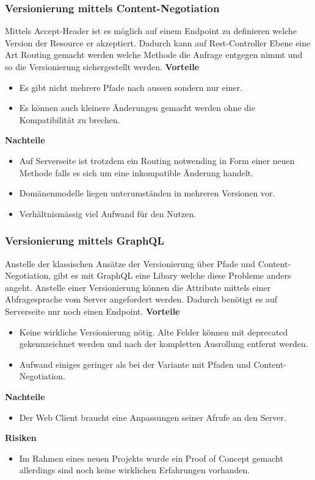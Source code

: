 \subsubsection{Versionierung mittels Content-Negotiation}

Mittels Accept-Header ist es möglich auf einem Endpoint zu definieren welche Version der Resource er akzeptiert. Dadurch kann auf Rest-Controller Ebene eine Art Routing gemacht werden welche Methode die Anfrage entgegen nimmt und so die Versionierung sichergestellt werden.
\newline
\newline
\textbf{Vorteile}
\begin{itemize}
	\item Es gibt nicht mehrere Pfade nach aussen sondern nur einer.
	\item Es können auch kleinere Änderungen gemacht werden ohne die Kompatibilität zu brechen.
\end{itemize}
\textbf{Nachteile}
\begin{itemize}
	\item Auf Serverseite ist trotzdem ein Routing notwending in Form einer neuen Methode falls es sich um eine inkompatible Änderung handelt.
	\item Domänenmodelle liegen unterumständen in mehreren Versionen vor.
	\item Verhältnismässig viel Aufwand für den Nutzen.
\end{itemize}

\subsubsection{Versionierung mittels GraphQL}

Anstelle der klassischen Ansätze der Versionierung über Pfade und Content-Negotiation, gibt es mit GraphQL eine Libary welche diese Probleme anders angeht. Anstelle einer Versionierung können die Attribute mittels einer Abfragesprache vom Server angefordert werden. Dadurch benötigt es auf Serverseite nur noch einen Endpoint.
\newline
\newline
\textbf{Vorteile}
\begin{itemize}
	\item Keine wirkliche Versionierung nötig. Alte Felder können mit deprecated gekennzeichnet werden und nach der kompletten Ausrollung entfernt werden.
	\item Aufwand einiges geringer als bei der Variante mit Pfaden und Content-Negotiation.
\end{itemize}
\textbf{Nachteile}
\begin{itemize}
	\item Der Web Client braucht eine Anpassungen seiner Afrufe an den Server.
\end{itemize}
\textbf{Risiken}
\begin{itemize}
	\item Im Rahmen eines neuen Projekts wurde ein Proof of Concept gemacht allerdings sind noch keine wirklichen Erfahrungen vorhanden.
\end{itemize}

